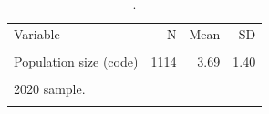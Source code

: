 \begin{table}[htbp]\centering
\caption{.}
\label{tab:population_summary}
\begin{tabular}{lrrr}\toprule
Variable & N & Mean & SD \\\\ \midrule
Population size (code) & 1114 & 3.69 & 1.40 \\\\
\bottomrule
\multicolumn{4}{l}{\footnotesize 2020 sample.} \\\\
\end{tabular}\end{table}
